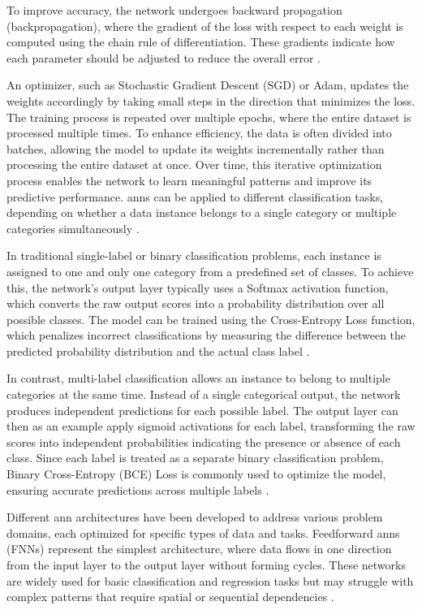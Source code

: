 To improve accuracy, the network undergoes backward propagation (backpropagation), where the gradient of the loss with respect to each weight is computed using the chain rule of differentiation.
These gradients indicate how each parameter should be adjusted to reduce the overall error \cite{russell2016artificial}.

An optimizer, such as Stochastic Gradient Descent (SGD) or Adam, updates the weights accordingly by taking small steps in the direction that minimizes the loss.
The training process is repeated over multiple epochs, where the entire dataset is processed multiple times.
To enhance efficiency, the data is often divided into batches, allowing the model to update its weights incrementally rather than processing the entire dataset at once.
Over time, this iterative optimization process enables the network to learn meaningful patterns and improve its predictive performance.
\ac{ann}s can be applied to different classification tasks, depending on whether a data instance belongs to a single category or multiple categories simultaneously \cite{russell2016artificial}.

In traditional single-label or binary classification problems, each instance is assigned to one and only one category from a predefined set of classes.
To achieve this, the network's output layer typically uses a Softmax activation function, which converts the raw output scores into a probability distribution over all possible classes.
The model can be trained using the Cross-Entropy Loss function, which penalizes incorrect classifications by measuring the difference between the predicted probability distribution and the actual class label \cite{russell2016artificial,herrera2016multilabel}.

In contrast, multi-label classification allows an instance to belong to multiple categories at the same time.
Instead of a single categorical output, the network produces independent predictions for each possible label.
The output layer can then as an example apply sigmoid activations for each label, transforming the raw scores into independent probabilities indicating the presence or absence of each class.
Since each label is treated as a separate binary classification problem, Binary Cross-Entropy (BCE) Loss is commonly used to optimize the model, ensuring accurate predictions across multiple labels \cite{russell2016artificial,herrera2016multilabel}.

Different \ac{ann} architectures have been developed to address various problem domains, each optimized for specific types of data and tasks.
Feedforward \ac{ann}s (FNNs) represent the simplest architecture, where data flows in one direction from the input layer to the output layer without forming cycles.
These networks are widely used for basic classification and regression tasks but may struggle with complex patterns that require spatial or sequential dependencies \cite{russell2016artificial,glorot2010understanding}.

